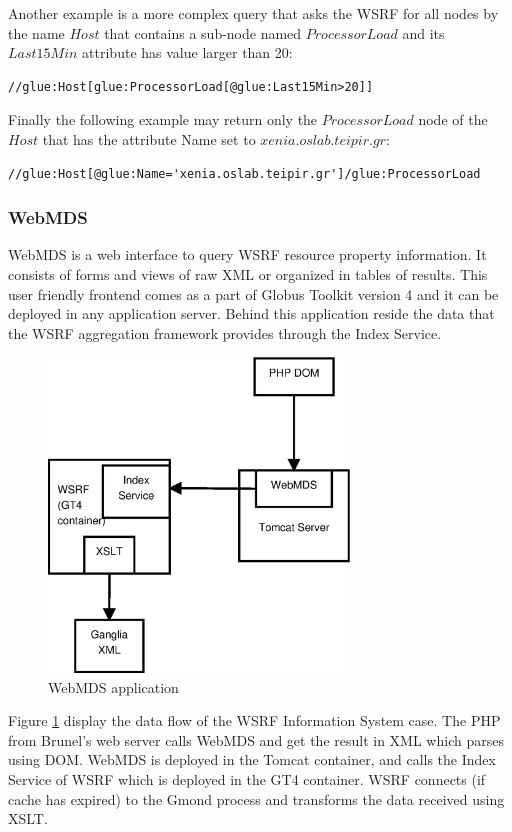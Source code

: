 Another example is a more complex query that asks the WSRF for all nodes by the name $Host$ that contains a sub-node named $ProcessorLoad$ and its $Last15Min$ attribute has value larger than 20:
\begin{lstlisting}
//glue:Host[glue:ProcessorLoad[@glue:Last15Min>20]]
\end{lstlisting}

Finally the following example may return only the $ProcessorLoad$ node of the $Host$ that has the attribute Name set to $xenia.oslab.teipir.gr$:
\begin{lstlisting}
//glue:Host[@glue:Name='xenia.oslab.teipir.gr']/glue:ProcessorLoad
\end{lstlisting}


\subsubsection{WebMDS}

WebMDS is a web interface to query WSRF resource property information. It consists of forms and views of raw XML or organized in tables of results. This user friendly frontend comes as a part of Globus Toolkit version 4 and it can be deployed in any application server. Behind this application reside the data that the WSRF aggregation framework provides through the Index Service.

\begin{figure}[htb]
\centering
 \includegraphics[width=80mm]{images/webmds.eps}
\caption{WebMDS application}
\label{figure:webmds}
\end{figure}

Figure \ref{figure:webmds} display the data flow of the WSRF Information System case. The PHP from Brunel's web server calls WebMDS and get the result in XML which parses using DOM. WebMDS is deployed in the Tomcat container, and calls the Index Service of WSRF which is deployed in the GT4 container. WSRF connects (if cache has expired) to the Gmond process and transforms the data received using XSLT.

